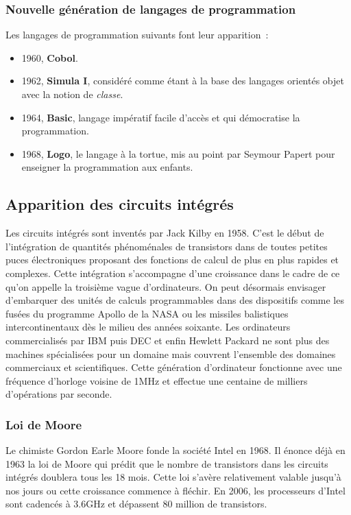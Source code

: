 \documentclass[a4paper,11pt]{book}
\begin{document}
\subsubsection{Nouvelle génération de langages de programmation}
Les langages de programmation suivants font leur apparition~:
\begin{itemize}
    \item 1960, \textbf{Cobol}.
    \item 1962, \textbf{Simula I}, considéré comme étant à la base des langages orientés objet avec la notion de \textit{classe}.
    \item 1964, \textbf{Basic}, langage impératif facile d'accès et qui démocratise la programmation.
    \item 1968, \textbf{Logo}, le langage à la tortue, mis au point par Seymour Papert pour enseigner la programmation aux enfants.
\end{itemize}
 
\subsection{Apparition des circuits intégrés}
Les circuits intégrés sont inventés par Jack Kilby en 1958. C'est le début de l'intégration de quantités phénoménales de transistors dans de toutes petites puces électroniques proposant des fonctions de calcul de plus en plus rapides et complexes. Cette intégration s'accompagne d'une croissance dans le cadre de ce qu'on appelle la troisième vague d'ordinateurs. On peut désormais envisager d'embarquer des unités de calculs programmables dans des dispositifs comme les fusées du programme Apollo de la NASA ou les missiles balistiques intercontinentaux dès le milieu des années soixante.
Les ordinateurs commercialisés par IBM puis DEC et enfin Hewlett Packard ne sont plus des machines spécialisées pour un domaine mais couvrent l'ensemble des domaines commerciaux et scientifiques.
Cette génération d'ordinateur fonctionne avec une fréquence d'horloge voisine de 1MHz et effectue une centaine de milliers d'opérations par seconde.

\subsubsection{Loi de Moore}
Le chimiste Gordon Earle Moore fonde la société Intel en 1968. Il énonce déjà en 1963 la loi de Moore qui prédit que le nombre de transistors dans les circuits intégrés doublera tous les 18 mois. Cette loi s'avère relativement valable jusqu'à nos jours ou cette croissance commence à fléchir. En 2006, les processeurs d'Intel sont cadencés à 3.6GHz et dépassent 80 million de transistors.
\end{document}
